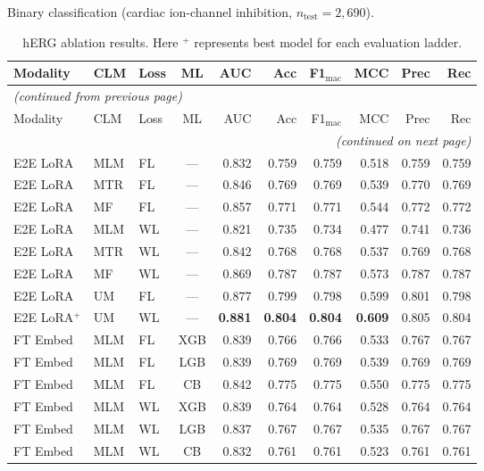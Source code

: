 \documentclass[9pt,a4paper]{article}
\begin{document}
Binary classification (cardiac ion-channel inhibition, $n_\text{test}=2{,}690$).

\begin{scriptsize}
\begin{longtable}{lllcrrrrrr}
\caption{hERG ablation results. Here $^{+}$ represents best model for each evaluation ladder.}
\label{tab:s5_herg} \\
\toprule
Modality & CLM & Loss & ML & AUC & Acc & F1$_\text{mac}$ & MCC & Prec & Rec \\
\midrule
\endfirsthead
\multicolumn{10}{l}{\footnotesize\textit{(continued from previous page)}} \\
\toprule
Modality & CLM & Loss & ML & AUC & Acc & F1$_\text{mac}$ & MCC & Prec & Rec \\
\midrule
\endhead
\midrule
\multicolumn{10}{r}{\footnotesize\textit{(continued on next page)}} \\
\endfoot
\bottomrule
\endlastfoot
E2E LoRA & MLM & FL & --- & 0.832 & 0.759 & 0.759 & 0.518 & 0.759 & 0.759 \\
E2E LoRA & MTR & FL & --- & 0.846 & 0.769 & 0.769 & 0.539 & 0.770 & 0.769 \\
E2E LoRA & MF  & FL & --- & 0.857 & 0.771 & 0.771 & 0.544 & 0.772 & 0.772 \\
E2E LoRA & MLM & WL & --- & 0.821 & 0.735 & 0.734 & 0.477 & 0.741 & 0.736 \\
E2E LoRA & MTR & WL & --- & 0.842 & 0.768 & 0.768 & 0.537 & 0.769 & 0.768 \\
E2E LoRA & MF  & WL & --- & 0.869 & 0.787 & 0.787 & 0.573 & 0.787 & 0.787 \\
E2E LoRA & UM  & FL & --- & 0.877 & 0.799 & 0.798 & 0.599 & 0.801 & 0.798 \\
E2E LoRA$^+$ & UM & WL & --- & \textbf{0.881} & \textbf{0.804} & \textbf{0.804} & \textbf{0.609} & 0.805 & 0.804 \\
\midrule
FT Embed & MLM & FL & XGB & 0.839 & 0.766 & 0.766 & 0.533 & 0.767 & 0.767 \\
FT Embed & MLM & FL & LGB & 0.839 & 0.769 & 0.769 & 0.539 & 0.769 & 0.769 \\
FT Embed & MLM & FL & CB  & 0.842 & 0.775 & 0.775 & 0.550 & 0.775 & 0.775 \\
FT Embed & MLM & WL & XGB & 0.839 & 0.764 & 0.764 & 0.528 & 0.764 & 0.764 \\
FT Embed & MLM & WL & LGB & 0.837 & 0.767 & 0.767 & 0.535 & 0.767 & 0.767 \\
FT Embed & MLM & WL & CB  & 0.832 & 0.761 & 0.761 & 0.523 & 0.761 & 0.761 \\

\end{longtable}
\end{scriptsize}
\end{document}
